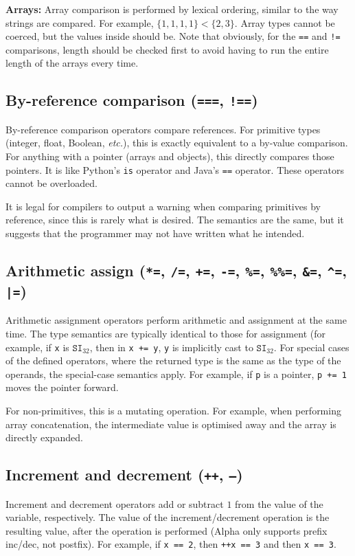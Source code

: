 \documentclass{article}
\newcommand{\R}[1]{\mathtt{#1}}
\begin{document}
\textbf{Arrays:} Array comparison is performed by lexical ordering, similar to
the way strings are compared. For example, $\{1, 1, 1, 1\} < \{2, 3\}$.
Array types cannot be coerced, but the values inside should be. Note that
obviously, for the \texttt{==} and \texttt{!=} comparisons, length should be
checked first to avoid having to run the entire length of the arrays every
time.

\subsection{By-reference comparison (\texttt{===}, \texttt{!==})}
\label{sub:operators:refcomp}
By-reference comparison operators compare references. For primitive types
(integer, float, Boolean, {\it etc.}), this is exactly equivalent to a
by-value comparison. For anything with a pointer (arrays and objects), this
directly compares those pointers. It is like Python's \texttt{is} operator
and Java's \texttt{==} operator. These operators cannot be overloaded.

It is legal for compilers to output a warning when comparing primitives
by reference, since this is rarely what is desired. The semantics are the
same, but it suggests that the programmer may not have written what he
intended.

\subsection{Arithmetic assign (\texttt{*=}, \texttt{/=}, \texttt{+=},
  \texttt{-=}, \texttt{\%=}, \texttt{\%\%=}, \texttt{\&=}, \texttt{\^{}=},
  \texttt{|=})}
\label{sub:operators:arithas}
Arithmetic assignment operators perform arithmetic and assignment at the same
time. The type semantics are typically identical to those for assignment
(for example, if \texttt{x} is $\R{SI}_{32}$, then in
\texttt{x~+=~y}, \texttt{y} is implicitly cast to $\R{SI}_{32}$. For special
cases of the defined operators, where the returned type is the same as the
type of the operands, the special-case semantics apply. For example, if
\texttt{p} is a pointer, \texttt{p~+=~1} moves the pointer forward.

For non-primitives, this is a mutating operation. For example, when performing
array concatenation, the intermediate value is optimised away and the
array is directly expanded.

\subsection {Increment and decrement (\texttt{++}, \texttt{--})}
\label{sub:operators:incdec}
Increment and decrement operators add or subtract $1$ from the value of the
variable, respectively. The value of the increment/decrement operation is the
resulting value, after the operation is performed (Alpha only supports prefix
inc/dec, not postfix). For example, if \texttt{x~==~2}, then
\texttt{++x~==~3} and then \texttt{x~==~3}.
\end{document}
